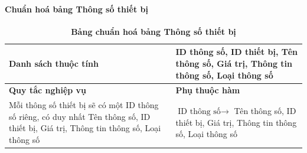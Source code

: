 \paragraph{Chuẩn hoá bảng Thông số thiết bị}
\mbox{}
\begin{table}[H]
	\caption{\bfseries \fontsize{12pt}{0pt}\selectfont Bảng chuẩn hoá bảng Thông số thiết bị}
	\centering
	\begin{tabularx}{0.9\textwidth}{|X|X|}
		\hline
		\textbf{Danh sách thuộc tính} & ID thông số, ID thiết bị, Tên thông số, Giá trị,
		Thông tin thông số, Loại thông số                                                                                           \\
		\hline
		\textbf{Quy tắc nghiệp vụ}    & \textbf{Phụ thuộc hàm}                                                                      \\
		\hline
		Mỗi thông số thiết bị sẽ có một ID thông số riêng, có duy nhất Tên thông số, ID thiết bị, Giá trị,
		Thông tin thông số, Loại thông số
		                              & \parbox[t]{\linewidth}{$\text{ID thông số} \rightarrow$ Tên thông số, ID thiết bị, Giá trị,
		Thông tin thông số, Loại thông số}                                                                                          \\
		\hline
		                                        \\
		                                                           \\
		\hline
	\end{tabularx}
\end{table}


